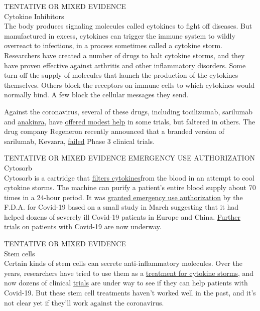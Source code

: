 TENTATIVE OR MIXED EVIDENCE\\
Cytokine Inhibitors\\
The body produces signaling molecules called cytokines to fight off
diseases. But manufactured in excess, cytokines can trigger the immune
system to wildly overreact to infections, in a process sometimes called
a cytokine storm. Researchers have created a number of drugs to halt
cytokine storms, and they have proven effective against arthritis and
other inflammatory disorders. Some turn off the supply of molecules that
launch the production of the cytokines themselves. Others block the
receptors on immune cells to which cytokines would normally bind. A few
block the cellular messages they send.

Against the coronavirus, several of these drugs, including tocilizumab,
sarilumab and
\href{https://onlinelibrary.wiley.com/doi/10.1002/art.41422}{anakinra},
have
\href{https://www.medrxiv.org/content/10.1101/2020.06.01.20119149v2}{offered
modest help} in some trials, but faltered in others. The drug company
Regeneron recently announced that a branded version of sarilumab,
Kevzara,
\href{https://www.nytimes3xbfgragh.onion/reuters/2020/07/02/us/02reuters-health-coronavirus-regeneron-pharms.html}{failed}
Phase 3 clinical trials.

TENTATIVE OR MIXED EVIDENCE EMERGENCY USE AUTHORIZATION\\
Cytosorb\\
Cytosorb is a cartridge that
\href{https://www.nytimes3xbfgragh.onion/2020/06/11/health/coronavirus-cytokine-storm.html}{filters
cytokines}from the blood in an attempt to cool cytokine storms. The
machine can purify a patient's entire blood supply about 70 times in a
24-hour period. It was
\href{https://www.nhlbi.nih.gov/news/2020/novel-blood-filter-approved-fda-emergency-treatment-covid-19}{granted
emergency use authorization} by the F.D.A. for Covid-19 based on a small
study in March suggesting that it had helped dozens of severely ill
Covid-19 patients in Europe and China.
\href{https://clinicaltrials.gov/ct2/results?cond=covid-19\&term=cytosorb\&cntry=\&state=\&city=\&dist=}{Further
trials} on patients with Covid-19 are now underway.

TENTATIVE OR MIXED EVIDENCE\\
Stem cells\\
Certain kinds of stem cells can secrete anti-inflammatory molecules.
Over the years, researchers have tried to use them as a
\href{https://celltrials.org/news/role-msc-treat-coronavirus-pneumonia-and-ards-part-1-is-emperor-wearing-clothes}{treatment
for cytokine storms}, and now dozens of clinical
\href{https://clinicaltrials.gov/ct2/results?term=stem+cell\&cond=COVID-19\&age_v=\&gndr=\&type=\&rslt=\&phase=0\&phase=1\&phase=2\&phase=3\&Search=Apply}{trials}
are under way to see if they can help patients with Covid-19. But these
stem cell treatments haven't worked well in the past, and it's not clear
yet if they'll work against the coronavirus.

